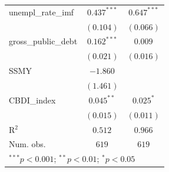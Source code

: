 \begin{table}
\begin{center}
\begin{tabular}{l c c}
unempl\_rate\_imf   & $0.437^{***}$  & $0.647^{***}$  \\
                    & $(0.104)$      & $(0.066)$      \\
gross\_public\_debt & $0.162^{***}$  & $0.009$        \\
                    & $(0.021)$      & $(0.016)$      \\
SSMY                & $-1.860$       &                \\
                    & $(1.461)$      &                \\
CBDI\_index         & $0.045^{**}$   & $0.025^{*}$    \\
                    & $(0.015)$      & $(0.011)$      \\
\hline
R$^2$               & $0.512$        & $0.966$        \\
Num. obs.           & $619$          & $619$          \\
\hline
\multicolumn{3}{l}{\scriptsize{$^{***}p<0.001$; $^{**}p<0.01$; $^{*}p<0.05$}}
\end{tabular}
\label{table:coefficients}
\end{center}
\end{table}
